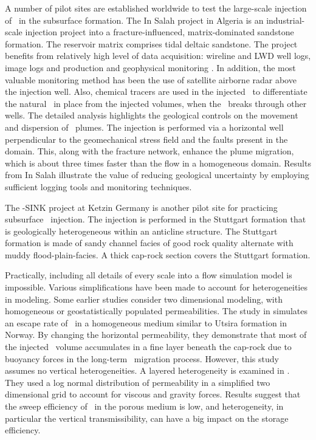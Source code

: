 A number of pilot sites are established worldwide to test the large-scale injection of \coo\ in the subsurface formation. The In Salah project \cite{riddiford2004monitoring} in Algeria is an industrial-scale injection project into a fracture-influenced, matrix-dominated sandstone formation. The reservoir matrix comprises tidal deltaic sandstone. The project benefits from relatively high level of data acquisition: wireline and LWD well logs, image logs and production and geophysical monitoring \cite{riddiford2004monitoring}. In addition, the most valuable monitoring method has been the use of satellite airborne radar above the injection well. Also, chemical tracers are used in the injected \coo\ to differentiate the natural \coo\ in place from the injected volumes, when the \coo\ breaks through other wells. The detailed analysis highlights the geological controls on the movement and dispersion of \coo\ plumes. The injection is performed via a horizontal well perpendicular to the geomechanical stress field and the faults present in the domain. This, along with the fracture network, enhance the plume migration, which is about three times faster than the flow in a homogeneous domain. Results from In Salah illustrate the value of reducing geological uncertainty by employing sufficient logging tools and monitoring techniques. 

The \coo-SINK project at Ketzin Germany \cite{forster2006baseline} is another pilot site for practicing subsurface \coo\ injection. The injection is performed in the Stuttgart formation that is geologically heterogeneous within an anticline structure. The Stuttgart formation is made of sandy channel facies of good rock quality alternate with muddy flood-plain-facies. A thick cap-rock section covers the Stuttgart formation.

Practically, including all details of every scale into a flow simulation model is impossible. Various simplifications have been made to account for heterogeneities in modeling. Some earlier studies consider two dimensional modeling, with homogeneous or geostatistically populated permeabilities. The study in \cite{lindeberg1997escape} simulates an escape rate of \coo\ in a homogeneous medium similar to Utsira formation in Norway. By changing the horizontal permeability, they demonstrate that most of the injected \coo\ volume accumulates in a fine layer beneath the cap-rock due to buoyancy forces in the long-term \coo\ migration process. However, this study assumes no vertical heterogeneities. A layered heterogeneity is examined in \cite{van1995co}. They used a log normal distribution of permeability in a simplified two dimensional grid to account for viscous and gravity forces. Results suggest that the sweep efficiency of \coo\ in the porous medium is low, and heterogeneity, in particular the vertical transmissibility, can have a big impact on the storage efficiency. 

